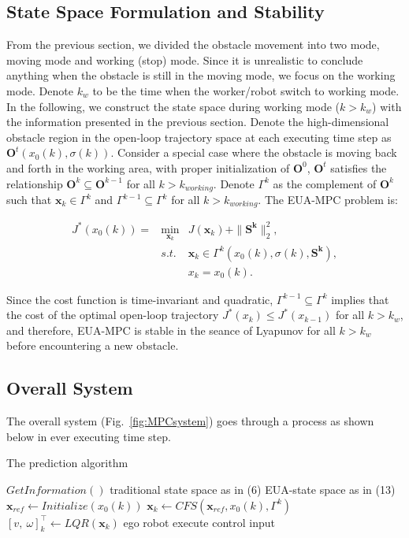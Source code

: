 \documentclass[letterpaper, 10 pt, conference]{ieeeconf}  %
\begin{document}
\subsection{State Space Formulation and Stability}
From the previous section, we divided the obstacle movement into two mode, moving mode and working (stop) mode. Since it is unrealistic to conclude anything when the obstacle is still in the moving mode, we focus on the working mode. Denote $k_w$ to be the time when the worker/robot switch to working mode. In the following, we construct the state space during working mode ($k>k_{w}$) with the information presented in the previous section. 
Denote the high-dimensional obstacle region in the open-loop trajectory space at each executing time step as $\mathbf{O}^t(x_0(k),\sigma(k))$. Consider a special case where the obstacle is moving back and forth in the working area, with proper initialization of $\mathbf{O}^0$, $\mathbf{O}^t$ satisfies the relationship $\mathbf{O}^k \subseteq \mathbf{O}^{k-1}$ for all $k>k_{working}$. Denote $\Gamma^k$ as the complement of $\mathbf{O}^k$ such that $\mathbf{x}_k \in \Gamma^k$ and $\Gamma^{k-1} \subseteq \Gamma^k$ for all $k>k_{working}$. The EUA-MPC problem is:

\begin{eqnarray}
J^*(x_0(k))=&\min_{\mathbf{x}_{k}} & J(\mathbf{x}_k) + \|\mathbf{S^k}\|_{2}^2 ,\\
&s.t.& \mathbf{x}_k \in \Gamma^k(x_0(k),\sigma(k),\mathbf{S^k}),\\
&&         x_{k}=x_0(k).
\end{eqnarray} 

Since the cost function is time-invariant and quadratic, $\Gamma^{k-1} \subseteq \Gamma^k$ implies that the cost of the optimal open-loop trajectory $J^*(x_k) \leq J^*(x_{k-1})$ for all $k>k_{w}$, and therefore, EUA-MPC is stable in the seance of Lyapunov for all $k>k_{w}$ before encountering a new obstacle.  

\subsection{Overall System}

The overall system (Fig.~\ref{fig:MPCsystem}) goes through a process as shown below in ever executing time step.

\begin{algorithm}
\caption{The prediction algorithm}\label{alg:euclid}
\begin{algorithmic}[1]
\State $GetInformation()$
    \State traditional state space as in (6)
\Else
    \State EUA-state space as in (13)  
\EndIf
\State $\mathbf{x}_{ref} \gets Initialize(x_0(k))$
\State $\mathbf{x}_k \gets CFS(\mathbf{x}_{ref},x_0(k),\Gamma^k)$
\State $[v ,\:\omega]_k^\top \gets LQR(\mathbf{x}_k)$ 
\State ego robot execute control input
\EndWhile
\end{algorithmic}
\end{algorithm}
 
\end{document}

